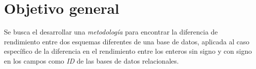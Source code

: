 \section{Objetivo general}

Se busca el desarrollar una \textit{metodología} para encontrar la diferencia de rendimiento entre dos esquemas diferentes de una base de datos, aplicada al caso específico de la diferencia en el rendimiento entre los enteros sin signo y con signo en los campos como \textit{ID} de las bases de datos relacionales.



